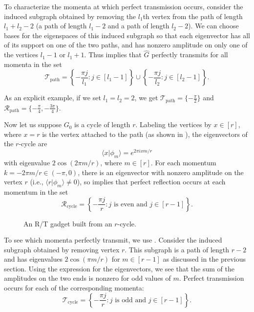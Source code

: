 \documentclass[../thesis-main/thesis-main]{subfiles}
\begin{document}
To characterize the momenta at which perfect transmission occurs, consider the induced subgraph obtained by removing the $l_1$th vertex from the path of length $l_1+l_2-2$ (a path of length $l_1-2$ and a path of length $l_2-2$). We can choose bases for the eigenspaces of this induced subgraph so that each eigenvector has all of its support on one of the two paths, and has nonzero amplitude on only one of the vertices $l_1-1$ or $l_1+1$. Thus  implies that $\widehat{G}$ perfectly transmits for all momenta in the set
\begin{equation}
  \mathcal{T}_{\mathrm{path}} = \left\{- \frac{\pi j}{l_1} \colon j\in [l_1-1]\right\} \cup \left\{-\frac{\pi j}{l_2 } \colon j \in [l_2-1]\right\}.
\end{equation}

As an explicit example, if we set $l_1 = l_2 = 2$, we get $\mathcal{T}_{\mathrm{path}} = \{-\frac{\pi}{2}\}$ and $\mathcal{R}_{\mathrm{path}} = \{-\frac{\pi}{4}, -\frac{3\pi}{4}\}$.


Now let us suppose $G_0$ is a cycle of length $r$. Labeling the vertices by $x \in [r]$, where $x=r$ is the vertex attached to the path (as shown in ), the eigenvectors of the $r$-cycle are
\begin{equation}
  \langle x | \phi_m\rangle = e^{{2 \pi i x m}/{r}}
\end{equation}
with eigenvalue $2 \cos(2 \pi m/r)$, where $m\in [r]$. For each momentum $k=-2 \pi m/r \in (-\pi,0)$, there is an eigenvector with nonzero amplitude on the vertex $r$ (i.e., $\langle r | \phi_m\rangle\neq 0$), so  implies that perfect reflection occurs at each momentum in the set
\begin{equation}
  \mathcal{R}_{\mathrm{cycle}} = \left\{ -\frac{\pi j}{r} \colon \text{$j$ is even and $j\in [r-1]$}\right\}.
\end{equation}


\begin{figure}
  \centering
  
  \caption{An R/T gadget built from an $r$-cycle.}
  \label{fig:RT_cycle}
\end{figure}


To see which momenta perfectly transmit, we use . Consider the induced subgraph obtained by removing vertex $r$. This subgraph is a path of length $r-2$ and has eigenvalues $2\cos(\pi m/r)$ for $m \in [r-1]$ as discussed in the previous section. Using the expression  for the eigenvectors, we see that the sum of the amplitudes on the two ends is nonzero for odd values of $m$.  Perfect transmission occurs for each of the corresponding momenta:  
\begin{equation}
  \mathcal{T}_{\mathrm{cycle}} = \left\{ -\frac{\pi j}{r} \colon \text{$j$ is odd and $j\in [r-1]$}\right\}.
\end{equation}
\end{document}
